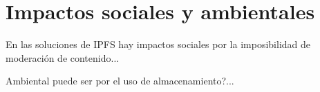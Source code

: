 \section{Impactos sociales y ambientales}

En las soluciones de IPFS hay impactos sociales por la imposibilidad de moderación de contenido...

Ambiental puede ser por el uso de almacenamiento?...